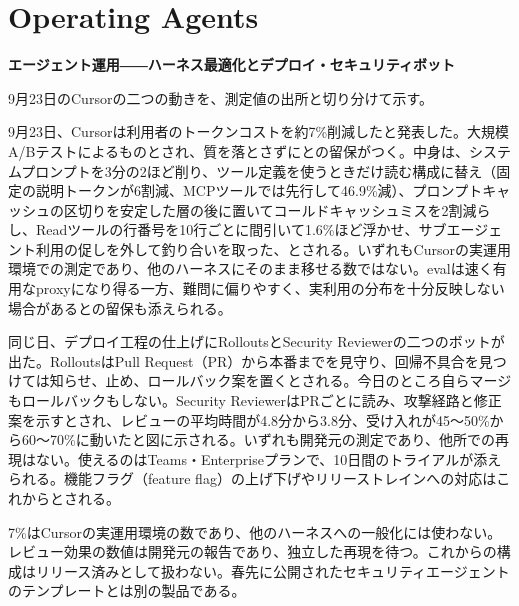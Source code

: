 \section{Operating Agents}
\begin{wideflow}
{\Large\bfseries エージェント運用――ハーネス最適化とデプロイ・セキュリティボット}\par
\smallskip
{\color{SurveyMuted}9月23日のCursorの二つの動きを、測定値の出所と切り分けて示す。}\par
\end{wideflow}

9月23日、Cursorは利用者のトークンコストを約7\%削減したと発表した\cite{cursoreff}。大規模A/Bテストによるものとされ、質を落とさずにとの留保がつく。中身は、システムプロンプトを3分の2ほど削り、ツール定義を使うときだけ読む構成に替え（固定の説明トークンが6割減、MCPツールでは先行して46.9\%減）、プロンプトキャッシュの区切りを安定した層の後に置いてコールドキャッシュミスを2割減らし、Readツールの行番号を10行ごとに間引いて1.6\%ほど浮かせ、サブエージェント利用の促しを外して釣り合いを取った、とされる。いずれもCursorの実運用環境での測定であり、他のハーネスにそのまま移せる数ではない。evalは速く有用なproxyになり得る一方、難問に偏りやすく、実利用の分布を十分反映しない場合があるとの留保も添えられる。

同じ日、デプロイ工程の仕上げにRolloutsとSecurity Reviewerの二つのボットが出た\cite{cursorrollouts}。RolloutsはPull Request（PR）から本番までを見守り、回帰不具合を見つけては知らせ、止め、ロールバック案を置くとされる。今日のところ自らマージもロールバックもしない。Security ReviewerはPRごとに読み、攻撃経路と修正案を示すとされ、レビューの平均時間が4.8分から3.8分、受け入れが45～50\%から60～70\%に動いたと図に示される。いずれも開発元の測定であり、他所での再現はない。使えるのはTeams・Enterpriseプランで、10日間のトライアルが添えられる。機能フラグ（feature flag）の上げ下げやリリーストレインへの対応はこれからとされる。

\begin{claimboundary}[資料と評価の境界]
7\%はCursorの実運用環境の数であり、他のハーネスへの一般化には使わない。レビュー効果の数値は開発元の報告であり、独立した再現を待つ。これからの構成はリリース済みとして扱わない。春先に公開されたセキュリティエージェントのテンプレートとは別の製品である。
\end{claimboundary}
